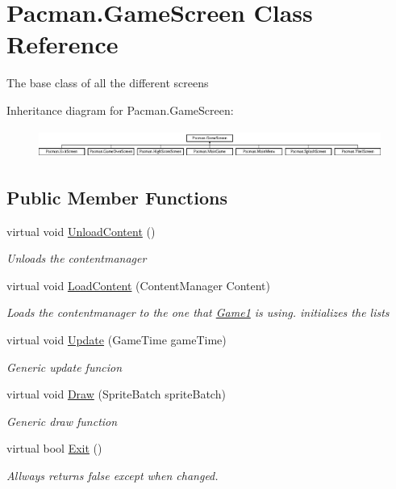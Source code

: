 \hypertarget{class_pacman_1_1_game_screen}{\section{Pacman.\-Game\-Screen Class Reference}
\label{class_pacman_1_1_game_screen}
}


The base class of all the different screens  


Inheritance diagram for Pacman.\-Game\-Screen\-:\begin{figure}[H]
\begin{center}
\leavevmode
\includegraphics[height=0.935673cm]{class_pacman_1_1_game_screen}
\end{center}
\end{figure}
\subsection*{Public Member Functions}
\begin{DoxyCompactItemize}
\item 
virtual void \hyperlink{class_pacman_1_1_game_screen_aa33ba4650a38762eca4bd059fb803942}{Unload\-Content} ()
\begin{DoxyCompactList}\small\item\em Unloads the contentmanager \end{DoxyCompactList}\item 
virtual void \hyperlink{class_pacman_1_1_game_screen_a33dbdc943439ae7728aff62b5152aa53}{Load\-Content} (Content\-Manager Content)
\begin{DoxyCompactList}\small\item\em Loads the contentmanager to the one that \hyperlink{class_pacman_1_1_game1}{Game1} is using. initializes the lists \end{DoxyCompactList}\item 
virtual void \hyperlink{class_pacman_1_1_game_screen_a768b26cbc3ed823d0dcba5055ae9a8b4}{Update} (Game\-Time game\-Time)
\begin{DoxyCompactList}\small\item\em Generic update funcion \end{DoxyCompactList}\item 
virtual void \hyperlink{class_pacman_1_1_game_screen_ab7d62816f246e29e70d352d094c36b04}{Draw} (Sprite\-Batch sprite\-Batch)
\begin{DoxyCompactList}\small\item\em Generic draw function \end{DoxyCompactList}\item 
virtual bool \hyperlink{class_pacman_1_1_game_screen_a23069d276b1952ecf9fed07d0424e771}{Exit} ()
\begin{DoxyCompactList}\small\item\em Allways returns false except when changed. \end{DoxyCompactList}\end{DoxyCompactItemize}
